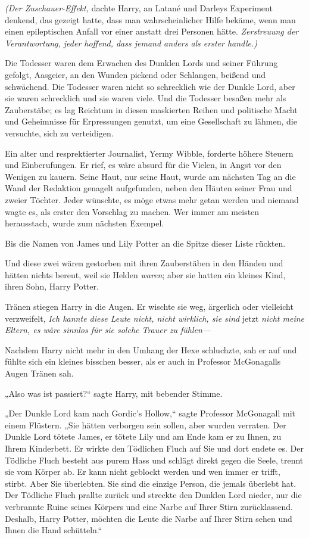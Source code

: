{\emph{(Der Zuschauer-Effekt,} dachte Harry, an Latané und Darleys Experiment denkend, das gezeigt hatte, dass man wahrscheinlicher Hilfe bekäme, wenn man einen epileptischen Anfall vor einer anstatt drei Personen hätte. \emph{Zerstreuung der Verantwortung, jeder hoffend, dass jemand anders als erster handle.)}

Die Todesser waren dem Erwachen des Dunklen Lords und seiner Führung gefolgt, Aasgeier, an den Wunden pickend oder Schlangen, beißend und schwächend. Die Todesser waren nicht so schrecklich wie der Dunkle Lord, aber sie waren schrecklich und sie waren viele. Und die Todesser besaßen mehr als Zauberstäbe; es lag Reichtum in diesen maskierten Reihen und politische Macht und Geheimnisse für Erpressungen genutzt, um eine Gesellschaft zu lähmen, die versuchte, sich zu verteidigen.

Ein alter und resprektierter Journalist, Yermy Wibble, forderte höhere Steuern und Einberufungen. Er rief, es wäre absurd für die Vielen, in Angst vor den Wenigen zu kauern. Seine Haut, nur seine Haut, wurde am nächsten Tag an die Wand der Redaktion genagelt aufgefunden, neben den Häuten seiner Frau und zweier Töchter. Jeder wünschte, es möge etwas mehr getan werden und niemand wagte es, als erster den Vorschlag zu machen. Wer immer am meisten herausstach, wurde zum nächsten Exempel.

Bis die Namen von James und Lily Potter an die Spitze dieser Liste rückten.

Und diese zwei wären gestorben mit ihren Zauberstäben in den Händen und hätten nichts bereut, weil sie Helden \emph{waren}; aber sie hatten ein kleines Kind, ihren Sohn, Harry Potter.

Tränen stiegen Harry in die Augen. Er wischte sie weg, ärgerlich oder vielleicht verzweifelt, \emph{Ich kannte diese Leute nicht, nicht wirklich, sie sind} jetzt \emph{nicht meine Eltern, es wäre sinnlos für sie solche Trauer zu fühlen—}

Nachdem Harry nicht mehr in den Umhang der Hexe schluchzte, sah er auf und fühlte sich ein kleines bisschen besser, als er auch in Professor McGonagalls Augen Tränen sah.

„Also was ist passiert?“ sagte Harry, mit bebender Stimme.

„Der Dunkle Lord kam nach Gordic's Hollow,“ sagte Professor McGonagall mit einem Flüstern. „Sie hätten verborgen sein sollen, aber wurden verraten. Der Dunkle Lord tötete James, er tötete Lily und am Ende kam er zu Ihnen, zu Ihrem Kinderbett. Er wirkte den Tödlichen Fluch auf Sie und dort endete es. Der Tödliche Fluch besteht aus purem Hass und schlägt direkt gegen die Seele, trennt sie vom Körper ab. Er kann nicht geblockt werden und wen immer er trifft, stirbt. Aber Sie überlebten. Sie sind die einzige Person, die jemals überlebt hat. Der Tödliche Fluch prallte zurück und streckte den Dunklen Lord nieder, nur die verbrannte Ruine seines Körpers und eine Narbe auf Ihrer Stirn zurücklassend. Deshalb, Harry Potter, möchten die Leute die Narbe auf Ihrer Stirn sehen und Ihnen die Hand schütteln.“

}
